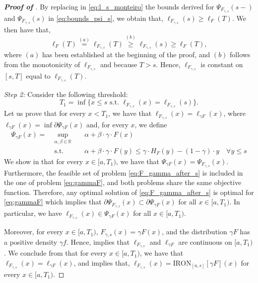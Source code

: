 \begin{proof}[\textbf{Proof of }]
By replacing in \eqref{eq:l_s_monteiro} the bounds derived for $\Psi_{F_{\gamma,s}}(s-) $ and $\Psi_{F_{\gamma,s}}(s)$ in \eqref{eq:bounds_psi_s}, we obtain that, $\ell_{F_{\gamma,s}}(s) \geq \ell_{F}(T).$ We then have that,
\begin{equation*}
    \ell_{F}(T) \stackrel{(a)}{=} \ell_{F_{\gamma,s}}(T) \stackrel{(b)}{\geq} \ell_{F_{\gamma,s}}(s) \geq \ell_{F}(T),
\end{equation*}
where $(a)$ has been established at the beginning of the proof, and $(b)$ follows from the monotonicity of $\ell_{F_{\gamma,s}}$ and because $T > s$. Hence, $\ell_{F_{\gamma,s}}$ is constant on $[s,T]$ equal to $\ell_{F_{\gamma,s}}(T)$.



\textit{Step 2:} 
Consider the following threshold:
\begin{equation}
\label{eq:def_T1}
    T_1 = \inf \{x \leq s \text{ s.t. } \ell_{F_{\gamma,s}}(x) = \ell_{F_{\gamma,s}}(s) \}. 
\end{equation}
Let us prove that for every $x < T_1$, we have that $\ell_{F_{\gamma,s}}(x) = \ell_{\gamma F}(x)$, where $\ell_{\gamma F}(x) = \inf \partial \Psi_{\gamma F}(x)$ and, for every $x$, we define
\begin{subequations}\label{eq:gammaF}
\begin{alignat}{2}
\Psi_{\gamma F}(x) = \; &\!\sup_{\alpha,\beta \in \mathbb{R}} &\;& \alpha +  \beta \cdot \gamma \cdot F(x) \\
&\text{s.t.} &      &  \alpha + \beta \cdot \gamma \cdot F(y) \leq \gamma \cdot H_{F}(y) - (1-\gamma) \cdot y \quad \forall y \leq s 
\end{alignat}
\end{subequations}
We  show in   that for every $x \in [a,T_1)$, we have that $\Psi_{\gamma F}(x) = \Psi_{F_{\gamma,s}}(x)$. Furthermore, the feasible set of problem \eqref{eq:F_gamma_after_s} is included in the one of problem \eqref{eq:gammaF}, and both problems share the same objective function. Therefore, any optimal solution of \eqref{eq:F_gamma_after_s} is optimal for \eqref{eq:gammaF} which implies that $\partial \Psi_{F_{\gamma,s}}(x) \subset \partial \Psi_{\gamma F}(x)$ for all $x \in [a,T_1)$. In particular, we have $\ell_{F_{\gamma,s}}(x) \in \Psi_{\gamma F}(x)$ for all $x \in [a,T_1)$. 

Moreover, for every $x \in [a,T_1)$, $F_{\gamma,s}(x) = \gamma F(x)$, and the distribution $\gamma F$ has a positive density $\gamma f$. Hence,  implies that $\ell_{F_{\gamma,s}}$ and $\ell_{\gamma F}$ are continuous on $[a,T_1)$. We conclude from  that for every $x \in [a,T_1)$, we have that $\ell_{F_{\gamma,s}}(x) = \ell_{\gamma F}(x)$, and  implies that, $\ell_{F_{\gamma,s}}(x) = \mathrm{IRON}_{[a,s]}[\gamma F](x)$ for every $x \in [a,T_1)$.
 

\end{proof}
